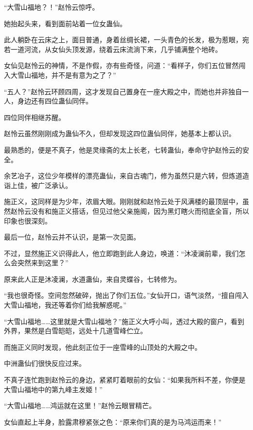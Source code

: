 
\begin{this_body}

“大雪山福地？！”赵怜云惊呼。

她抬起头来，看到面前站着一位女蛊仙。

此人躺卧在云床之上，面目普通，身着丝绸长裙，一头青色的长发，极为惹眼，宛若一道河流，从女仙头顶发源，绕着云床流淌下来，几乎铺满整个地砖。

女仙见赵怜云的神情，不是作假，亦有些奇怪，问道：“看样子，你们五位冒然闯入大雪山福地，并不是有意为之了？”

“五人？”赵怜云环顾四周，这才发现自己置身在一座大殿之中，而她也并非独自一人，身边还有四位蛊仙同伴。

四位同伴相继苏醒。

赵怜云虽然刚刚成为蛊仙不久，但却发现这四位蛊仙同伴，她基本上都认识。

最熟悉的，便是不真子，他是灵缘斋的太上长老，七转蛊仙，奉命守护赵怜云的安全。

余艺冶子，这位少年模样的漂亮蛊仙，来自古魂门，修为虽然只是六转，但炼道造诣上佳，被广泛承认。

施正义，这同样是为少年，浓眉大眼。刚刚就和赵怜云处于风满楼的最顶层中，虽然赵怜云没有和施正义搭话，但见过他父亲施阁，因为黑灯瞎火而彻底全盲，所以印象也很深刻。

最后一位，赵怜云并不认识，是第一次见面。

不过，显然施正义识得此人，他立即跑到此人身边，唤道：“沐凌澜前辈，我们怎么会突然来到这里？”

原来此人正是沐凌澜，水道蛊仙，来自灵蝶谷，七转修为。

“我也很奇怪。空间忽然破碎，抛出了你们五位。”女仙开口，语气淡然，“擅自闯入大雪山福地，我还等着你们给我解惑呢。”

“大雪山福地……这里就是大雪山福地？”施正义大呼小叫，透过大殿的窗户，看到外界，果然是白雪皑皑，远处十几道雪峰伫立。

而施正义同时发现，他此刻正位于一座雪峰的山顶处的大殿之中。

中洲蛊仙们很快反应过来。

不真子连忙跑到赵怜云的身边，紧紧盯着眼前的女仙：“如果我所料不差，你便是大雪山福地中的第九峰主发姬！”

“大雪山福地……鸿运就在这里！”赵怜云眼冒精芒。

女仙直起上半身，脸露肃穆紧张之色：“原来你们真的是为马鸿运而来！”


\end{this_body}
